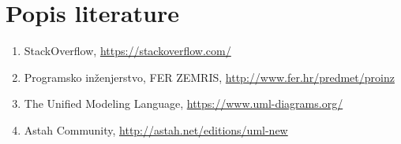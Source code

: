 \chapter*{Popis literature}
		
		
		\begin{enumerate}
			
			\item  StackOverflow, \url{https://stackoverflow.com/}
			
			\item  Programsko inženjerstvo, FER ZEMRIS, \url{http://www.fer.hr/predmet/proinz}
		
			
			
			
			
			\item  The Unified Modeling Language, \url{https://www.uml-diagrams.org/}
			
			\item  Astah Community, \url{http://astah.net/editions/uml-new}
		\end{enumerate}
		
		 
